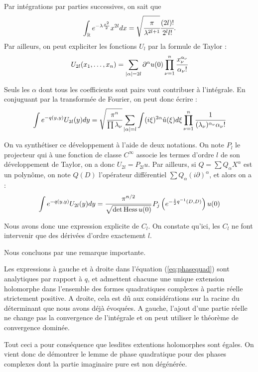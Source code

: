 Par intégrations par parties successives, on sait que 
\begin{equation*}
  \int_{\mathbb{R}} e^{-\lambda \frac{x^2}{2}}x^{2l}dx = \sqrt{\cfrac{\pi}{\lambda^{2l+1}}}\cfrac{(2l)!}{2^l l!}.
\end{equation*}
\noindent Par ailleurs, on peut expliciter les fonctions $U_l$ par la formule de Taylor :
\begin{equation*}
  U_{2l}(x_1,\ldots,x_n) = \sum_{|\alpha|=2l}\partial^{\alpha}u(0)\prod_{\nu=1}^{n}\cfrac{x_{\nu}^{\alpha_{\nu}}}{\alpha_{\nu}!}
\end{equation*}

Seuls les $\alpha$ dont tous les coefficients sont pairs vont contribuer à l'intégrale. En conjuguant par la transformée de Fourier, on peut donc écrire :
\begin{equation*}
  \int e^{-q(y,y)}U_{2l}(y)dy = \sqrt{\cfrac{\pi^n}{\prod \lambda_{\nu}}}\sum_{|\alpha|=l}\int (i\xi)^{2\alpha}\hat{u}(\xi)d\xi \prod_{\nu=1}^{n} \cfrac{1}{(\lambda_{\nu})^{\alpha_{\nu}}\alpha_{\nu}!}
  \end{equation*}
  
On va synthétiser ce développement à l'aide de deux notations. On note $P_l$ le projecteur qui à une fonction de classe $C^{\infty}$ associe les termes d'ordre $l$ de son développement de Taylor, on a donc $U_{2l}=P_{2l}u$. Par ailleurs, si $Q= \sum Q_{\alpha}X^{\alpha}$ est un polynôme, on note $Q(D)$ l'opérateur différentiel $\sum Q_{\alpha}(i\partial)^\alpha$, et alors on a :
\begin{equation}
\label{eq:phasequad}
  \int e^{-q(y,y)}U_{2l}(y)dy =\cfrac{\pi^{n/2}}{\sqrt{\det \operatorname{Hess} u(0)}}\,P_j\left(e^{-\frac{1}{2}q^{-1}(D,D)}\right)u(0)
  \end{equation}

\noindent Nous avons donc une expression explicite de $C_l$. On constate qu'ici, les $C_l$ ne font intervenir que des dérivées d'ordre exactement $l$.

Nous concluons par une remarque importante.

\begin{rem}
Les expressions à gauche et à droite dans l'équation (\ref{eq:phasequad}) sont analytiques par rapport à $q$, et admettent chacune une unique extension holomorphe dans l'ensemble des formes quadratiques complexes à partie réelle strictement positive. A droite, cela est dû aux considérations sur la racine du déterminant que nous avons déjà évoquées. A gauche, l'ajout d'une partie réelle ne change pas la convergence de l'intégrale et on peut utiliser le théorème de convergence dominée.

Tout ceci a pour conséquence que lesdites extentions holomorphes sont égales. On vient donc de démontrer le lemme de phase quadratique pour des phases complexes dont la partie imaginaire pure est non dégénérée.
\end{rem}

